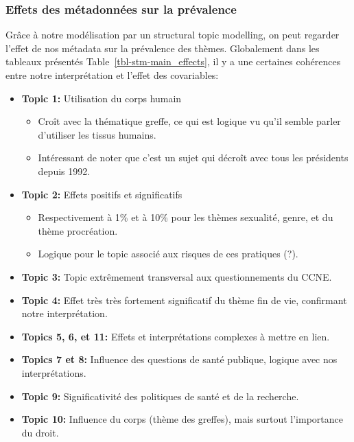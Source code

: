 \documentclass[
  letterpaper,
  DIV=11,
  numbers=noendperiod]{scrartcl}
\providecommand{\tightlist}{%
  \setlength{\itemsep}{0pt}\setlength{\parskip}{0pt}}\usepackage{longtable,booktabs,array}
\begin{document}
\hypertarget{effets-des-muxe9tadonnuxe9es-sur-la-pruxe9valence}{%
\subsubsection{Effets des métadonnées sur la
prévalence}\label{effets-des-muxe9tadonnuxe9es-sur-la-pruxe9valence}}

Grâce à notre modélisation par un structural topic modelling, on peut
regarder l'effet de nos métadata sur la prévalence des thèmes.
Globalement dans les tableaux présentés
Table~\ref{tbl-stm-main_effects}, il y a une certaines cohérences entre
notre interprétation et l'effet des covariables:

\begin{itemize}
\item
  \textbf{Topic 1:} Utilisation du corps humain

  \begin{itemize}
  \tightlist
  \item
    Croît avec la thématique greffe, ce qui est logique vu qu'il semble
    parler d'utiliser les tissus humains.
  \item
    Intéressant de noter que c'est un sujet qui décroît avec tous les
    présidents depuis 1992.
  \end{itemize}
\item
  \textbf{Topic 2:} Effets positifs et significatifs

  \begin{itemize}
  \tightlist
  \item
    Respectivement à 1\% et à 10\% pour les thèmes sexualité, genre, et
    du thème procréation.
  \item
    Logique pour le topic associé aux risques de ces pratiques (?).
  \end{itemize}
\item
  \textbf{Topic 3:} Topic extrêmement transversal aux questionnements du
  CCNE.
\item
  \textbf{Topic 4:} Effet très très fortement significatif du thème fin
  de vie, confirmant notre interprétation.
\item
  \textbf{Topics 5, 6, et 11:} Effets et interprétations complexes à
  mettre en lien.
\item
  \textbf{Topics 7 et 8:} Influence des questions de santé publique,
  logique avec nos interprétations.
\item
  \textbf{Topic 9:} Significativité des politiques de santé et de la
  recherche.
\item
  \textbf{Topic 10:} Influence du corps (thème des greffes), mais
  surtout l'importance du droit.
\end{itemize}
\end{document}
